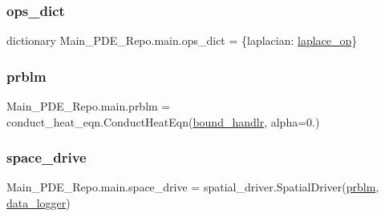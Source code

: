 \subsubsection{\texorpdfstring{ops\+\_\+dict}{ops\_dict}}
{\footnotesize\ttfamily dictionary Main\+\_\+\+P\+D\+E\+\_\+\+Repo.\+main.\+ops\+\_\+dict = \{\textquotesingle{}laplacian\textquotesingle{}\+: \hyperlink{namespaceMain__PDE__Repo_1_1main_a09e5f3ede1c619b4753684e77c63c9cd}{laplace\+\_\+op}\}}

\mbox{\label{namespaceMain__PDE__Repo_1_1main_a3868ee6e3a7637e20745a4aecbdd4002}} 
\subsubsection{\texorpdfstring{prblm}{prblm}}
{\footnotesize\ttfamily Main\+\_\+\+P\+D\+E\+\_\+\+Repo.\+main.\+prblm = conduct\+\_\+heat\+\_\+eqn.\+Conduct\+Heat\+Eqn(\hyperlink{namespaceMain__PDE__Repo_1_1main_a47a9833e51d57f5f1cbaf2e6b38274be}{bound\+\_\+handlr}, alpha=0.)}

\mbox{\label{namespaceMain__PDE__Repo_1_1main_a9450a1548e6c8d9316ce9ef5b053883e}} 
\subsubsection{\texorpdfstring{space\+\_\+drive}{space\_drive}}
{\footnotesize\ttfamily Main\+\_\+\+P\+D\+E\+\_\+\+Repo.\+main.\+space\+\_\+drive = spatial\+\_\+driver.\+Spatial\+Driver(\hyperlink{namespaceMain__PDE__Repo_1_1main_a3868ee6e3a7637e20745a4aecbdd4002}{prblm}, \hyperlink{namespaceMain__PDE__Repo_1_1main_af6467b085d01bd160fc83b50e93c0e54}{data\+\_\+logger})}

\mbox{\label{namespaceMain__PDE__Repo_1_1main_a87fde87043b4ff2798a7802cb61a3cbc}} 
